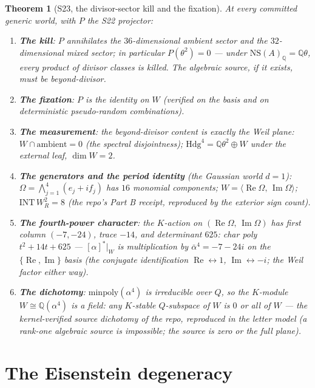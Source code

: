 \documentclass[11pt]{article}
\newtheorem{theorem}{Theorem}[section]
\begin{document}
\begin{theorem}[S23, the divisor-sector kill and the fixation]\label{thm:s23}
At every committed generic world, with $P$ the S22 projector:
\begin{enumerate}
\item \textbf{The kill}: $P$ annihilates the $36$-dimensional ambient sector
and the $32$-dimensional mixed sector; in particular
$P(\theta^2) = 0$ --- under $\mathrm{NS}(A)_\mathbb{Q} = \mathbb{Q}\theta$,
\emph{every product of divisor classes is killed}. The algebraic source, if
it exists, must be beyond-divisor.
\item \textbf{The fixation}: $P$ is the identity on $W$ (verified on the
basis and on deterministic pseudo-random combinations).
\item \textbf{The measurement}: the beyond-divisor content is exactly the
Weil plane: $W \cap \mathrm{ambient} = 0$ (the spectral disjointness);
$\mathrm{Hdg}^4 = \mathbb{Q}\theta^2 \oplus W$ under the external leaf,
$\dim W = 2$.
\item \textbf{The generators and the period identity} (the Gaussian world
$d=1$): $\Omega = \bigwedge_{j=1}^4(e_j + i f_j)$ has $16$ monomial
components; $W = \langle \operatorname{Re}\Omega,\,
\operatorname{Im}\Omega\rangle$; $\mathrm{INT}\,W_R^2 = 8$
(the repo's Part B receipt, reproduced by the exterior sign count).
\item \textbf{The fourth-power character}: the $K$-action on
$(\operatorname{Re}\Omega,\,\operatorname{Im}\Omega)$ has first column
$(-7,-24)$, trace $-14$, and determinant $625$: char poly
$t^2 + 14t + 625$ --- $[\alpha]^*|_W$ is multiplication by
$\bar{\alpha}^4 = -7-24i$ on the $\{\operatorname{Re},\operatorname{Im}\}$
basis (the conjugate identification $\operatorname{Re}\leftrightarrow 1$,
$\operatorname{Im}\leftrightarrow -i$; the Weil factor either way).
\item \textbf{The dichotomy}: $\mathrm{minpoly}(\alpha^4)$ is irreducible
over $Q$, so the $K$-module $W \cong \mathbb{Q}(\alpha^4)$ is a field: any
$K$-stable $Q$-subspace of $W$ is $0$ or all of $W$ --- the kernel-verified
source dichotomy of the repo, reproduced in the letter model (a rank-one
algebraic source is impossible; the source is zero or the full plane).
\end{enumerate}
\end{theorem}

\section{The Eisenstein degeneracy}
\end{document}
